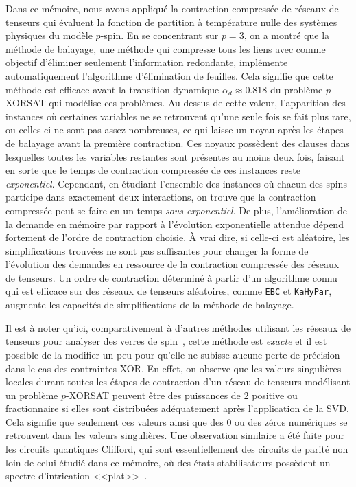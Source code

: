 \begin{comment}
\end{comment}

\Conclusion %

Dans ce mémoire, nous avons appliqué la contraction compressée de réseaux de tenseurs qui évaluent la fonction de partition à température nulle des systèmes physiques du modèle $p$-spin.
En se concentrant sur $p = 3$, on a montré que la méthode de balayage, une méthode qui compresse tous les liens avec comme objectif d'éliminer seulement l'information redondante, implémente automatiquement l'algorithme d'élimination de feuilles.
Cela signifie que cette méthode est efficace avant la transition dynamique $\alpha_d \approx 0.818$ du problème $p$-XORSAT qui modélise ces problèmes.
Au-dessus de cette valeur, l'apparition des instances où certaines variables ne se retrouvent qu'une seule fois se fait plus rare, ou celles-ci ne sont pas assez nombreuses, ce qui laisse un noyau après les étapes de balayage avant la première contraction.
Ces noyaux possèdent des clauses dans lesquelles toutes les variables restantes sont présentes au moins deux fois, faisant en sorte que le temps de contraction compressée de ces instances reste \emph{exponentiel}.
Cependant, en étudiant l'ensemble des instances où chacun des spins participe dans exactement deux interactions, on trouve que la contraction compressée peut se faire en un temps \emph{sous-exponentiel}.
De plus, l'amélioration de la demande en mémoire par rapport à l'évolution exponentielle attendue dépend fortement de l'ordre de contraction choisie.
À vrai dire, si celle-ci est aléatoire, les simplifications trouvées ne sont pas suffisantes pour changer la forme de l'évolution des demandes en ressource de la contraction compressée des réseaux de tenseurs.
Un ordre de contraction déterminé à partir d'un algorithme connu qui est efficace sur des réseaux de tenseurs aléatoires, comme \verb|EBC| et \verb|KaHyPar|, augmente les capacités de simplifications de la méthode de balayage.

Il est à noter qu'ici, comparativement à d'autres méthodes utilisant les réseaux de tenseurs pour analyser des verres de spin~\cite{zhu2019tensor}, cette méthode est \emph{exacte} et il est possible de la modifier un peu pour qu'elle ne subisse aucune perte de précision dans le cas des contraintes XOR.
En effet, on observe que les valeurs singulières locales durant toutes les étapes de contraction d'un réseau de tenseurs modélisant un problème $p$-XORSAT peuvent être des puissances de $2$ positive ou fractionnaire si elles sont distribuées adéquatement après l'application de la SVD.
Cela signifie que seulement ces valeurs ainsi que des $0$ ou des zéros numériques se retrouvent dans les valeurs singulières.
Une observation similaire a été faite pour les circuits quantiques Clifford, qui sont essentiellement des circuits de parité non loin de celui étudié dans ce mémoire, où des états stabilisateurs possèdent un spectre d'intrication <<plat>>~\cite{fattal2004entanglement, Hamma2005entropy, zhou2020Clifford}.

